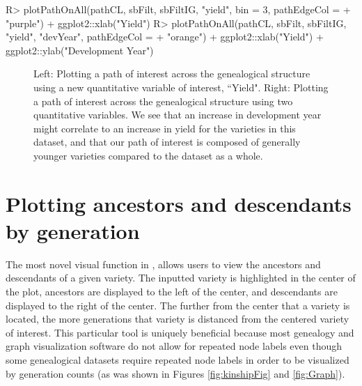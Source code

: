 \documentclass[article,shortnames]{jss}
\begin{document}
\begin{Code}
R> plotPathOnAll(pathCL, sbFilt, sbFiltIG, "yield", bin = 3, pathEdgeCol =
+    "purple") + ggplot2::xlab("Yield")
R> plotPathOnAll(pathCL, sbFilt, sbFiltIG, "yield", "devYear", pathEdgeCol =
+    "orange") + ggplot2::xlab("Yield") + ggplot2::ylab("Development Year")
\end{Code}

\begin{figure}[h]
    \centering
    \caption{Left: Plotting a path of interest across the genealogical structure using a new quantitative variable of interest, ``Yield". Right: Plotting a path of interest across the genealogical structure using two quantitative variables. We see that an increase in development year might correlate to an increase in yield for the varieties in this dataset, and that our path of interest is composed of generally younger varieties compared to the dataset as a whole.}
    \label{fig:plotPathOnAllQV2}
\end{figure}

\section{Plotting ancestors and descendants by generation}
\label{remedy}

The most novel visual function in ,  allows users to view the ancestors and descendants of a given variety. The inputted variety is highlighted in the center of the plot, ancestors are displayed to the left of the center, and descendants are displayed to the right of the center. The further from the center that a variety is located, the more generations that variety is distanced from the centered variety of interest. This particular  tool is uniquely beneficial because most genealogy and graph visualization software do not allow for repeated node labels even though some genealogical datasets require repeated node labels in order to be visualized by generation counts (as was shown in Figures \ref{fig:kinshipFig} and \ref{fig:Graph}).
\end{document}
